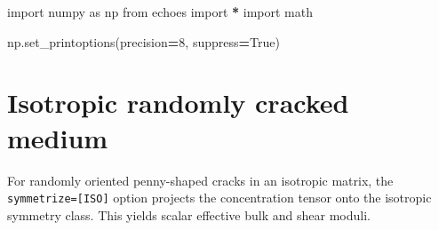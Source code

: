 \documentclass[
  a4paper,
  numbers=noendperiod,
  DIV=12]{scrreprt}
\newenvironment{Shaded}{\begin{snugshade}}{\end{snugshade}}
\newcommand{\DecValTok}[1]{\textcolor[rgb]{0.00,0.00,0.81}{#1}}
\newcommand{\ImportTok}[1]{#1}
\newcommand{\NormalTok}[1]{#1}
\newcommand{\OperatorTok}[1]{\textcolor[rgb]{0.81,0.36,0.00}{\textbf{#1}}}
\newcommand{\VariableTok}[1]{\textcolor[rgb]{0.00,0.00,0.00}{#1}}
\begin{document}
\begin{tcolorbox}[enhanced jigsaw, arc=.35mm, bottomrule=.15mm, bottomtitle=1mm, breakable, colback=white, colbacktitle=quarto-callout-tip-color!10!white, colframe=quarto-callout-tip-color-frame, coltitle=black, left=2mm, leftrule=.75mm, opacityback=0, opacitybacktitle=0.6, rightrule=.15mm, title={Imports}, titlerule=0mm, toprule=.15mm, toptitle=1mm]

\begin{Shaded}
\begin{Highlighting}[]
\ImportTok{import}\NormalTok{ numpy }\ImportTok{as}\NormalTok{ np}
\ImportTok{from}\NormalTok{ echoes }\ImportTok{import} \OperatorTok{*}
\ImportTok{import}\NormalTok{ math}

\NormalTok{np.set\_printoptions(precision}\OperatorTok{=}\DecValTok{8}\NormalTok{, suppress}\OperatorTok{=}\VariableTok{True}\NormalTok{)}
\end{Highlighting}
\end{Shaded}

\end{tcolorbox}

\section{Isotropic randomly cracked
medium}\label{isotropic-randomly-cracked-medium}

For randomly oriented penny-shaped cracks in an isotropic matrix, the
\texttt{symmetrize={[}ISO{]}} option projects the concentration tensor
onto the isotropic symmetry class. This yields scalar effective bulk and
shear moduli.
\end{document}
